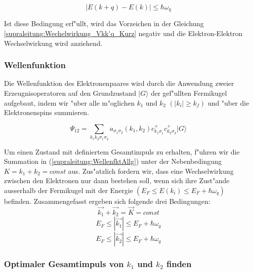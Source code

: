 \begin{refsection}
\begin{equation}
|E(k+q)-E(k)|\le\hbar\omega_q
\label{supraleitung:Phonon Energie}
\end{equation}

Ist diese Bedingung erf"ullt, wird das Vorzeichen in der Gleichung \ref{supraleitung:Wechelwirkung_Vkk'q_Kurz} negativ und die Elektron-Elektron Wechselwirkung wird anziehend.

\subsubsection{Wellenfunktion}
Die Wellenfunktion des Elektronenpaares wird durch die Anwendung zweier Erzeugnisoperatoren auf den Grundzustand $|G\rangle$ der gef"ullten Fermikugel aufgebaut, indem wir "uber alle m"oglichen $k_1$ und $k_2$ $(|k_i| \ge k_f)$ und "uber die Elektronenspins summieren.

\begin{equation}
\Psi_{12}=\sum \limits_{k_1k_2\sigma_1\sigma_2} a_{\sigma_1\sigma_2}(k_1,k_2)c^+_{k_1\sigma_1}c^+_{k_2\sigma_2}|G\rangle
\label{supraleitung:WellenfktAllg}
\end{equation}

Um einen Zustand mit definiertem Gesamtimpuls zu erhalten, f"uhren wir die Summation in (\ref{supraleitung:WellenfktAllg}) unter der Nebenbedingung $K=k_1+k_2=const$ aus. Zus"atzlich fordern wir, dass eine Wechselwirkung zwischen den Elektronen nur dann bestehen soll, wenn sich ihre Zust"ande ausserhalb der Fermikugel mit der Energie $(E_F \le E(k_i) \le E_F+\hbar\omega_q)$ befinden.
Zusammengefasst ergeben sich folgende drei Bedingungen:
\[
\overrightarrow{k_1}+\overrightarrow{k_2}=\overrightarrow{K}=const
\]
\[
E_F\le|\overrightarrow{k_1}|\le E_F+\hbar\omega_q
\]
\[
E_F\le|\overrightarrow{k_2}|\le E_F+\hbar\omega_q
\]
\subsubsection{Optimaler Gesamtimpuls von $k_1$ und $k_2$ finden}


\end{refsection}
